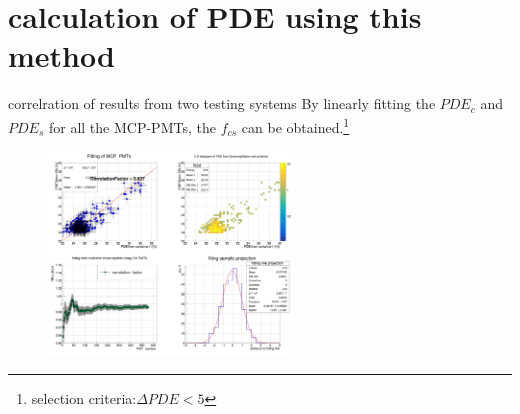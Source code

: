 \documentclass[11pt,compress,xcolor=x11names,UTF8]{beamer}
\begin{document}
\section{calculation of PDE using this method}
%
\begin{frame}{correlration of results from two testing systems}
By linearly fitting the $PDE_c$ and $PDE_s$ for all the MCP-PMTs, the $f_{cs}$ can be obtained.\footnote{selection criteria:$\Delta PDE<5$}
\begin{figure}
\centering
\includegraphics[width=0.58\textwidth]{fit_mcp_noint}
\end{figure}

\end{frame}
\end{document}

